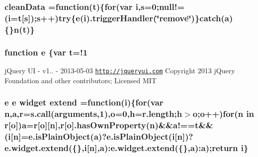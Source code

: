 \hypertarget{root_2static_2root_2js_2jquery-ui_8custom_8min_8js_a69cf3a5538f71f728a82d0faf3b132c7}{
\subsubsection[{clean\-Data}]{ clean\-Data =function({\bf t})\{{\bf for}(var {\bf i},{\bf s}=0;null!=({\bf i}={\bf t}\mbox{[}{\bf s}\mbox{]});{\bf s}++){\bf try}\{{\bf e}({\bf i}).trigger\-Handler(\char`\"{}remove\char`\"{})\}catch({\bf a})\{\}{\bf n}({\bf t})\}}}\label{root_2static_2root_2js_2jquery-ui_8custom_8min_8js_a69cf3a5538f71f728a82d0faf3b132c7}
\hypertarget{root_2static_2root_2js_2jquery-ui_8custom_8min_8js_a2c038346d47955cbe2cb91e338edd7e1}{
\subsubsection[{e}]{\setlength{\rightskip}{0pt plus 5cm}function e \{var {\bf t}=!1}}\label{root_2static_2root_2js_2jquery-ui_8custom_8min_8js_a2c038346d47955cbe2cb91e338edd7e1}
j\-Query U\-I -\/ v1.. -\/ 2013-\/05-\/03 \href{http://jqueryui.com}{\tt http\-://jqueryui.\-com} Copyright 2013 j\-Query Foundation and other contributors; Licensed M\-I\-T \hypertarget{root_2static_2root_2js_2jquery-ui_8custom_8min_8js_af1e9b89a10c289e9c53907c6f0c3b595}{
\subsubsection[{extend}]{ {\bf e} {\bf e} {\bf widget} extend =function({\bf i})\{{\bf for}(var {\bf n},{\bf a},{\bf r}={\bf s.\-call}(arguments,1),{\bf o}=0,{\bf h}=r.\-length;{\bf h}$>${\bf o};{\bf o}++){\bf for}({\bf n} in {\bf r}\mbox{[}{\bf o}\mbox{]}){\bf a}={\bf r}\mbox{[}{\bf o}\mbox{]}\mbox{[}{\bf n}\mbox{]},{\bf r}\mbox{[}{\bf o}\mbox{]}.has\-Own\-Property({\bf n})\&\&a!=={\bf t}\&\&({\bf i}\mbox{[}{\bf n}\mbox{]}=e.\-is\-Plain\-Object({\bf a})?e.\-is\-Plain\-Object({\bf i}\mbox{[}{\bf n}\mbox{]})?e.\-widget.\-extend(\{\},{\bf i}\mbox{[}{\bf n}\mbox{]},{\bf a})\-:e.\-widget.\-extend(\{\},{\bf a})\-:{\bf a});return {\bf i}\}}}\label{root_2static_2root_2js_2jquery-ui_8custom_8min_8js_af1e9b89a10c289e9c53907c6f0c3b595}
